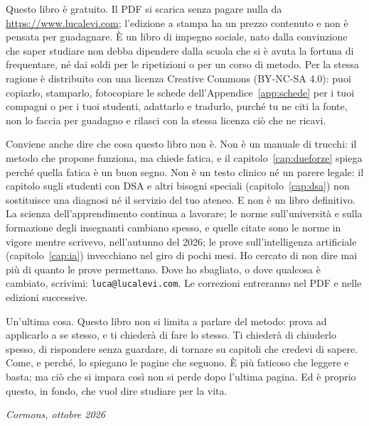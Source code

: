Questo libro è gratuito. Il PDF si scarica senza pagare nulla da
\url{https://www.lucalevi.com}; l'edizione a stampa ha un prezzo
contenuto e non è pensata per guadagnare. È un libro di impegno
sociale, nato dalla convinzione che saper studiare non debba dipendere
dalla scuola che si è avuta la fortuna di frequentare, né dai soldi per
le ripetizioni o per un corso di metodo. Per la stessa ragione è
distribuito con una licenza Creative Commons (BY-NC-SA 4.0): puoi
copiarlo, stamparlo, fotocopiare le schede dell'Appendice~\ref{app:schede}
per i tuoi compagni o per i tuoi studenti, adattarlo e tradurlo,
purché tu ne citi la fonte, non lo faccia per guadagno e rilasci con la
stessa licenza ciò che ne ricavi.

Conviene anche dire che cosa questo libro non è. Non è un manuale di
trucchi: il metodo che propone funziona, ma chiede fatica, e il
capitolo~\ref{cap:dueforze} spiega perché quella fatica è un buon
segno. Non è un testo clinico né un parere legale: il capitolo sugli
studenti con DSA e altri bisogni speciali
(capitolo~\ref{cap:dsa}) non sostituisce una diagnosi né il servizio
del tuo ateneo. E non è un libro definitivo. La scienza
dell'apprendimento continua a lavorare; le norme sull'università e
sulla formazione degli insegnanti cambiano spesso, e quelle citate sono
le norme in vigore mentre scrivevo, nell'autunno del 2026; le prove
sull'intelligenza artificiale (capitolo~\ref{cap:ia}) invecchiano nel
giro di pochi mesi. Ho cercato di non dire mai più di quanto le prove
permettano. Dove ho sbagliato, o dove qualcosa è cambiato, scrivimi:
\texttt{luca@lucalevi.com}. Le correzioni entreranno nel PDF e nelle
edizioni successive.

Un'ultima cosa. Questo libro non si limita a parlare del metodo: prova
ad applicarlo a se stesso, e ti chiederà di fare lo stesso. Ti chiederà
di chiuderlo spesso, di rispondere senza guardare, di tornare su
capitoli che credevi di sapere. Come, e perché, lo spiegano le pagine
che seguono. È più faticoso che leggere e basta; ma ciò che si impara
così non si perde dopo l'ultima pagina. Ed è proprio questo, in fondo,
che vuol dire studiare per la vita.

\begin{flushright}
  \itshape Cormons, ottobre 2026
\end{flushright}

\finecapitolo

